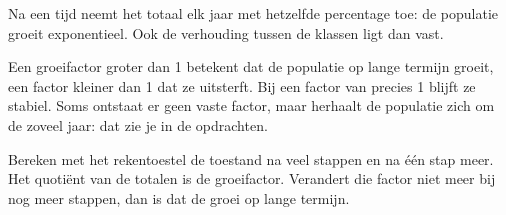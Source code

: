 Na een tijd neemt het totaal elk jaar met hetzelfde percentage toe: de populatie groeit exponentieel. Ook de verhouding tussen de klassen ligt dan vast.


Een groeifactor groter dan 1 betekent dat de populatie op lange termijn groeit, een factor kleiner dan 1 dat ze uitsterft. Bij een factor van precies 1 blijft ze stabiel. Soms ontstaat er geen vaste factor, maar herhaalt de populatie zich om de zoveel jaar: dat zie je in de opdrachten.

\begin{werkwijze}
Bereken met het rekentoestel de toestand na veel stappen en na één stap meer. Het quotiënt van de totalen is de groeifactor. Verandert die factor niet meer bij nog meer stappen, dan is dat de groei op lange termijn.
\end{werkwijze}

\begin{oefeningen}
\end{oefeningen}

\opdrachtenkop

